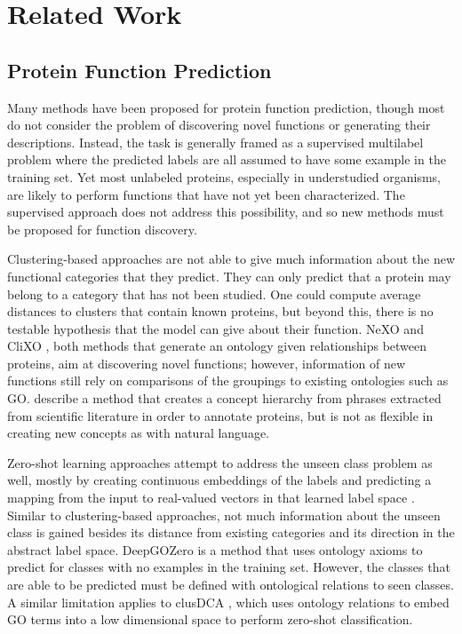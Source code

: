 \documentclass{article}
\begin{document}
\section{Related Work}
\subsection{Protein Function Prediction} %
Many methods have been proposed for protein function prediction, though most do not consider the problem of discovering novel functions or generating their descriptions.
Instead, the task is generally framed as a supervised multilabel problem where the predicted labels are all assumed to have some example in the training set.
Yet most unlabeled proteins, especially in understudied organisms, are likely to perform functions that have not yet been characterized.
The supervised approach does not address this possibility, and so new methods must be proposed for function discovery.

Clustering-based approaches are not able to give much information about the new functional categories that they predict.
They can only predict that a protein may belong to a category that has not been studied.
One could compute average distances to clusters that contain known proteins, but beyond this, there is no testable hypothesis that the model can give about their function.
NeXO \citet{NeXO} and CliXO \citet{CliXO}, both methods that generate an ontology given relationships between proteins, aim at discovering novel functions; however, information of new functions still rely on comparisons of the groupings to existing ontologies such as GO. \citet{wang2018annotating} describe a method that creates a concept hierarchy from phrases extracted from scientific literature in order to annotate proteins, but is not as flexible in creating new concepts as with natural language.

Zero-shot learning approaches attempt to address the unseen class problem as well, mostly by creating continuous embeddings of the labels and predicting a mapping from the input to real-valued vectors in that learned label space \citet{CLIP}.
Similar to clustering-based approaches, not much information about the unseen class is gained besides its distance from existing categories and its direction in the abstract label space.
DeepGOZero \citet{DeepGOZero} is a method that uses ontology axioms to predict for classes with no examples in the training set.
However, the classes that are able to be predicted must be defined with ontological relations to seen classes. A similar limitation applies to clusDCA \citet{clusDCA}, which uses ontology relations to embed GO terms into a low dimensional space to perform zero-shot classification.
\end{document}
